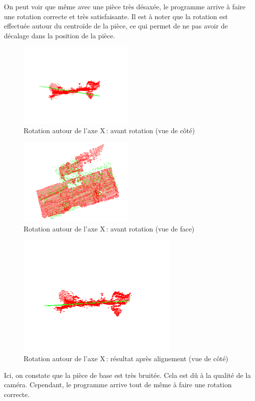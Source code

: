 On peut voir que même avec une pièce très désaxée, le programme arrive à faire une rotation correcte et très satisfaisante. Il est à noter que la rotation est effectuée autour du centroïde de la pièce, ce qui permet de ne pas avoir de décalage dans la position de la pièce.
\begin{figure}[H]
    \centering
    \includegraphics[width=0.50\textwidth]{assets/figures/rot_x_avt_cote.png}
    \caption{Rotation autour de l’axe X : avant rotation (vue de côté)}
    \label{fig:rot_x_avt_cote}
\end{figure}
\begin{figure}[H]
    \centering
    \includegraphics[width=0.50\textwidth]{assets/figures/rot_x_avt_face.png}
    \caption{Rotation autour de l’axe X : avant rotation (vue de face)}
    \label{fig:rot_x_avt_face}
\end{figure}
\begin{figure}[H]
    \centering
    \includegraphics[width=0.70\textwidth]{assets/figures/rot_x_aprs_cote.png}
    \caption{Rotation autour de l’axe X : résultat après alignement (vue de côté)}
    \label{fig:rot_x_aprs_cote}
\end{figure}
Ici, on constate que la pièce de base est très bruitée. Cela est dû à la qualité de la caméra. Cependant, le programme arrive tout de même à faire une rotation correcte.


